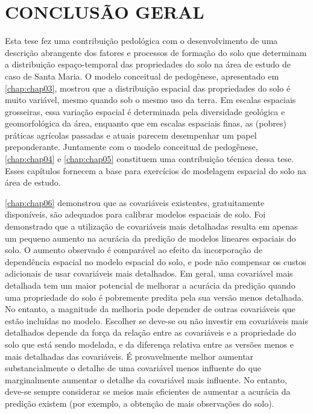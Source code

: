 \artigofalse
\chapter{CONCLUSÃO GERAL}
\label{appen:conclusion-pt}

Esta tese fez uma contribuição pedológica com o desenvolvimento de uma descrição abrangente dos fatores e 
processos de formação do solo que determinam a distribuição espaço-temporal das propriedades do solo na área 
de estudo de caso de Santa Maria. O modelo conceitual de pedogênese, apresentado em \autoref{chap:chap03}, 
mostrou que a distribuição espacial das propriedades do solo é muito variável, mesmo quando sob o mesmo uso da 
terra. Em escalas espaciais grosseiras, essa variação espacial é determinada pela diversidade geológica e 
geomorfológica da área, enquanto que em escalas espaciais finas, as (pobres) práticas agrícolas passadas e 
atuais parecem desempenhar um papel preponderante. Juntamente com o modelo conceitual de pedogênese, 
\autoref{chap:chap04} e \autoref{chap:chap05} constituem uma contribuição técnica dessa tese. Esses capítulos 
fornecem a base para exercícios de modelagem espacial do solo na área de estudo.

\autoref{chap:chap06} demonstrou que as covariáveis existentes, gratuitamente disponíveis, são adequados para 
calibrar modelos espaciais de solo. Foi demonstrado que a utilização de covariáveis mais detalhadas resulta em 
apenas um pequeno aumento na acurácia da predição de modelos lineares espaciais do solo. O aumento observado é 
comparável ao efeito da incorporação de dependência espacial no modelo espacial do solo, e pode não compensar 
os custos adicionais de usar covariáveis mais detalhados. Em geral, uma covariável mais detalhada tem um maior 
potencial de melhorar a acurácia da predição quando uma propriedade do solo é pobremente predita pela sua 
versão menos detalhada. No entanto, a magnitude da melhoria pode depender de outras covariáveis que estão 
incluídas no modelo. Escolher se deve-se ou não investir em covariáveis mais detalhados depende da força da 
relação entre as covariáveis e a propriedade do solo que está sendo modelada, e da diferença relativa entre as 
versões menos e mais detalhadas das covariáveis. É provavelmente melhor aumentar substancialmente o detalhe de 
uma covariável menos influente do que marginalmente aumentar o detalhe da covariável mais influente. No 
entanto, deve-se sempre considerar se meios mais eficientes de aumentar a acurácia da predição existem (por 
exemplo, a obtenção de mais observações do solo).

